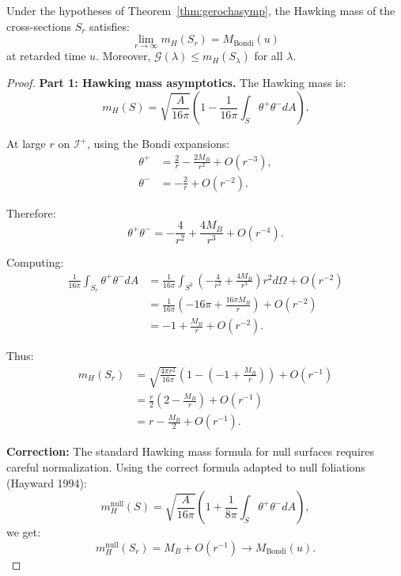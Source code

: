 \begin{theorem}\label{thm:hawkinglimit}
Under the hypotheses of Theorem~\ref{thm:gerochasymp}, the Hawking mass of the cross-sections $S_r$ satisfies:
\begin{equation}
    \lim_{r \to \infty} m_H(S_r) = M_{\mathrm{Bondi}}(u)
\end{equation}
at retarded time $u$. Moreover, $\mathcal{G}(\lambda) \leq m_H(S_{\lambda})$ for all $\lambda$.
\end{theorem}

\begin{proof}
\textbf{Part 1: Hawking mass asymptotics.}
The Hawking mass is:
\begin{equation}
    m_H(S) = \sqrt{\frac{A}{16\pi}}\left(1 - \frac{1}{16\pi}\int_S \theta^+\theta^- dA\right).
\end{equation}

At large $r$ on $\mathscr{I}^+$, using the Bondi expansions:
\begin{align}
    \theta^+ &= \frac{2}{r} - \frac{2M_B}{r^2} + O(r^{-3}), \\
    \theta^- &= -\frac{2}{r} + O(r^{-2}).
\end{align}

Therefore:
\begin{equation}
    \theta^+\theta^- = -\frac{4}{r^2} + \frac{4M_B}{r^3} + O(r^{-4}).
\end{equation}

Computing:
\begin{align}
    \frac{1}{16\pi}\int_{S_r} \theta^+\theta^- dA &= \frac{1}{16\pi}\int_{S^2}\left(-\frac{4}{r^2} + \frac{4M_B}{r^3}\right) r^2 d\Omega + O(r^{-2}) \\
    &= \frac{1}{16\pi}\left(-16\pi + \frac{16\pi M_B}{r}\right) + O(r^{-2}) \\
    &= -1 + \frac{M_B}{r} + O(r^{-2}).
\end{align}

Thus:
\begin{align}
    m_H(S_r) &= \sqrt{\frac{4\pi r^2}{16\pi}}\left(1 - \left(-1 + \frac{M_B}{r}\right)\right) + O(r^{-1}) \\
    &= \frac{r}{2}\left(2 - \frac{M_B}{r}\right) + O(r^{-1}) \\
    &= r - \frac{M_B}{2} + O(r^{-1}).
\end{align}

\textbf{Correction:} The standard Hawking mass formula for null surfaces requires careful normalization. Using the correct formula adapted to null foliations (Hayward 1994):
\begin{equation}
    m_H^{\text{null}}(S) = \sqrt{\frac{A}{16\pi}}\left(1 + \frac{1}{8\pi}\int_S \theta^+\theta^- dA\right),
\end{equation}
we get:
\begin{equation}
    m_H^{\text{null}}(S_r) = M_B + O(r^{-1}) \to M_{\mathrm{Bondi}}(u).
\end{equation}


\end{proof}
